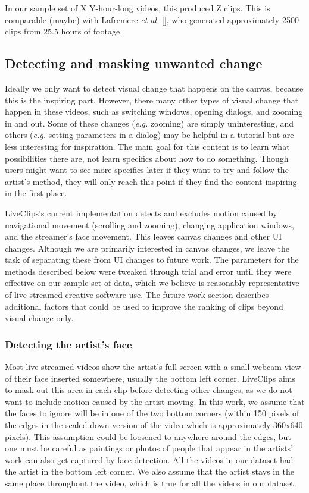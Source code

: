 In our sample set of X Y-hour-long videos, this produced Z clips. This is comparable (maybe) with Lafreniere \textit{et al.} [], who generated approximately 2500 clips from 25.5 hours of footage.

\subsection{Detecting and masking unwanted change}
Ideally we only want to detect visual change that happens on the canvas, because this is the inspiring part. However, there many other types of visual change that happen in these videos, such as switching windows, opening dialogs, and zooming in and out. Some of these changes (\textit{e.g.} zooming) are simply uninteresting, and others (\textit{e.g.} setting parameters in a dialog) may be helpful in a tutorial but are less interesting for inspiration. The main goal for this content is to learn what possibilities there are, not learn specifics about how to do something. Though users might want to see more specifics later if they want to try and follow the artist's method, they will only reach this point if they find the content inspiring in the first place. 

LiveClips's current implementation detects and excludes motion caused by navigational movement (scrolling and zooming), changing application windows, and the streamer's face movement. This leaves canvas changes and other UI changes. Although we are primarily interested in canvas changes, we leave the task of separating these from UI changes to future work. The parameters for the methods described below were tweaked through trial and error until they were effective on our sample set of data, which we believe is reasonably representative of live streamed creative software use. The future work section describes additional factors that could be used to improve the ranking of clips beyond visual change only.

\subsubsection{Detecting the artist's face}
Most live streamed videos show the artist's full screen with a small webcam view of their face inserted somewhere, usually the bottom left corner. LiveClips aims to mask out this area in each clip before detecting other changes, as we do not want to include motion caused by the artist moving. In this work, we assume that the faces to ignore will be in one of the two bottom corners (within 150 pixels of the edges in the scaled-down version of the video which is approximately 360x640 pixels). This assumption could be loosened to anywhere around the edges, but one must be careful as paintings or photos of people that appear in the artists' work can also get captured by face detection. All the videos in our dataset had the artist in the bottom left corner. We also assume that the artist stays in the same place throughout the video, which is true for all the videos in our dataset.

